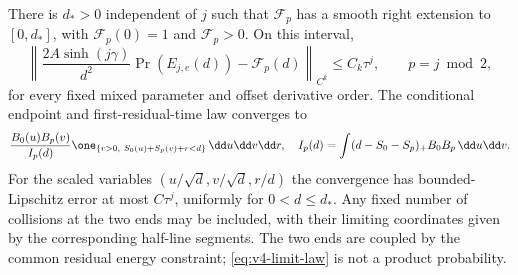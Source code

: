 \begin{theorem}\label{thm:v4-law}
There is $d_*>0$ independent of $j$ such that $\mathcal F_p$ has a
smooth right extension to $[0,d_*]$, with $\mathcal F_p(0)=1$ and
$\mathcal F_p>0$. On this interval,
\begin{equation}\label{eq:v4-F-convergence}
 \left\|\frac{2A\sinh(j\gamma)}{d^2}\Pr(E_{j,e}(d))
                   -\mathcal F_p(d)\right\|_{C^k}
 \le C_k\tau^j,\qquad p=j\bmod2,
\end{equation}
for every fixed mixed parameter and offset derivative order.
The conditional endpoint and first-residual-time law converges to
\begin{equation}\label{eq:v4-limit-law}
 \frac{B_0(u)B_p(v)}{I_p(d)}
 \one_{\{r>0,\ S_0(u)+S_p(v)+r<d\}}\,\dd u\dd v\dd r,
 \quad I_p(d)=\int(d-S_0-S_p)_+B_0B_p\,\dd u\dd v.
\end{equation}
For the scaled variables $(u/\sqrt d,v/\sqrt d,r/d)$ the convergence
has bounded-Lipschitz error at most $C\tau^j$, uniformly for
$0<d\le d_*$. Any fixed number of collisions at the two ends may be
included, with their limiting coordinates given by the corresponding
half-line segments. The two ends are coupled by the common residual
energy constraint; \eqref{eq:v4-limit-law} is not a product probability.
\end{theorem}
